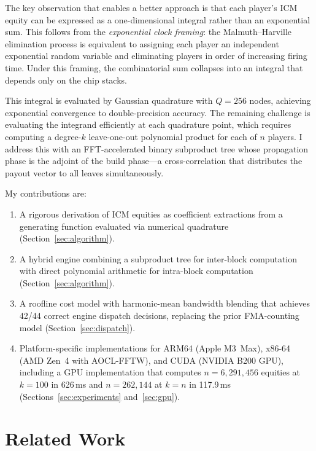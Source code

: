 \documentclass[11pt]{article}
\begin{document}
The key observation that enables a better approach is that each player's
ICM equity can be expressed as a one-dimensional integral rather than an
exponential sum. This follows from the \emph{exponential clock framing}:
the Malmuth--Harville elimination process is equivalent to assigning each
player an independent exponential random variable and eliminating players
in order of increasing firing time. Under this framing, the combinatorial
sum collapses into an integral that depends only on the chip stacks.

This integral is evaluated by Gaussian quadrature with $Q = 256$ nodes,
achieving exponential convergence to double-precision accuracy. The
remaining challenge is evaluating the integrand efficiently at each
quadrature point, which requires computing a degree-$k$ leave-one-out
polynomial product for each of $n$ players. I address this with an
FFT-accelerated binary subproduct tree whose propagation phase is the
adjoint of the build phase---a cross-correlation that distributes the
payout vector to all leaves simultaneously.

My contributions are:
\begin{enumerate}
  \item A rigorous derivation of ICM equities as coefficient extractions
    from a generating function evaluated via numerical quadrature
    (Section~\ref{sec:algorithm}).
  \item A hybrid engine combining a subproduct tree for inter-block
    computation with direct polynomial arithmetic for intra-block
    computation (Section~\ref{sec:algorithm}).
  \item A roofline cost model with harmonic-mean bandwidth blending that
    achieves 42/44 correct engine dispatch decisions, replacing the
    prior FMA-counting model (Section~\ref{sec:dispatch}).
  \item Platform-specific implementations for ARM64 (Apple M3~Max),
    x86-64 (AMD Zen~4 with AOCL-FFTW), and CUDA (NVIDIA B200 GPU),
    including a GPU implementation that computes $n = 6{,}291{,}456$
    equities at $k = 100$ in 626\,ms and $n = 262{,}144$ at $k = n$ in
    117.9\,ms (Sections~\ref{sec:experiments} and~\ref{sec:gpu}).
\end{enumerate}


\section{Related Work}\label{sec:related}
\end{document}
